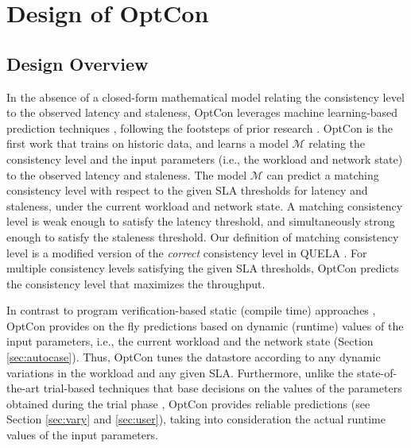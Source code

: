 \documentclass[conference]{IEEEtran}
\begin{document}
\section{Design of OptCon}\label{sec:design}
\subsection{Design Overview}\label{sec:designover}
   In the absence of a closed-form mathematical model relating the consistency level to the observed latency and staleness, OptCon leverages machine learning-based prediction techniques \cite{Flach:2012:MLA:2490546}, following the footsteps of prior research  \cite{lacurts2014cicada,Winstein:2013:TEM:2486001.2486020,Ravindranath:2013:TCU:2517349.2522717}. OptCon is the first work that trains on historic data, and learns a model \emph{$\mathcal{M}$} relating the consistency level and the input parameters (i.e., the workload and network state) to the observed latency and staleness. The model $\mathcal{M}$ can predict a matching consistency level with respect to the given SLA thresholds for latency and staleness, under the current workload and network
   state. A matching consistency level is weak enough to satisfy the latency threshold, and simultaneously strong enough to satisfy the staleness threshold.
     Our definition of matching consistency level is a modified version of the \emph{correct} consistency level in QUELA \cite{Sivaramakrishnan:2015:DPO:2813885.2737981}. For  multiple consistency levels satisfying the given SLA thresholds, OptCon predicts the consistency level that maximizes the throughput.
      \par In contrast to program verification-based static (compile time) approaches \cite{Sivaramakrishnan:2015:DPO:2813885.2737981},
      OptCon provides on the fly predictions based on dynamic (runtime) values of the input parameters, i.e., the current workload and the network state (Section \ref{sec:autocase}).
       Thus, OptCon tunes the datastore according to any dynamic variations in the workload and any given SLA.
       Furthermore, unlike the
      state-of-the-art trial-based techniques that base decisions on the values of the parameters obtained during the trial phase \cite{Terry:2013:CSL:2517349.2522731, Ardekani:2014:SGC:2685048.2685077},
      OptCon provides reliable predictions (see Section \ref{sec:vary} and \ref{sec:user}), taking into consideration the actual runtime values of the input parameters.
  \begin{table}[!htb]
\centering
\captionsetup{justification=centering}
\caption{Example subSLAs}\label{table:sla}
\end{table}
\end{document}
